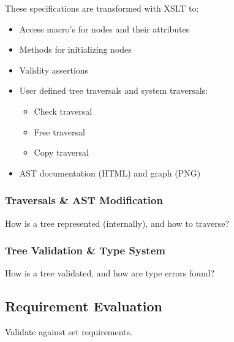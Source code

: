 \documentclass[final,a4paper,12pt]{article}
\begin{document}
These specifications are transformed with XSLT to:
\begin{itemize}
	\item Access macro's for nodes and their attributes
	\item Methods for initializing nodes
	\item Validity assertions
	\item User defined tree traversals and system traversals:
	\begin{itemize}
		\item Check traversal
		\item Free traversal
		\item Copy traversal
	\end{itemize}
	\item AST documentation (HTML) and graph (PNG)
\end{itemize}

\subsubsection{Traversals \& AST Modification}
How is a tree represented (internally), and how to traverse?
\subsubsection{Tree Validation \& Type System}
How is a tree validated, and how are type errors found?
\subsection{Requirement Evaluation}
Validate against set requirements.
\end{document}
